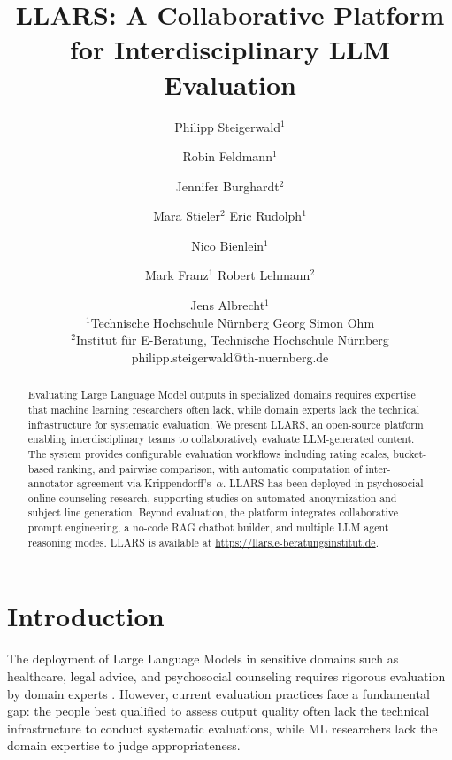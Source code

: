 \documentclass{article}
\title{LLARS: A Collaborative Platform for Interdisciplinary LLM Evaluation}
\author{
Philipp Steigerwald$^{1}$\and
Robin Feldmann$^{1}$\and
Jennifer Burghardt$^{2}$\and
Mara Stieler$^{2}$\And
Eric Rudolph$^{1}$\and
Nico Bienlein$^{1}$\and
Mark Franz$^{1}$\And
Robert Lehmann$^{2}$\and
Jens Albrecht$^{1}$\\
\affiliations
$^{1}$Technische Hochschule N\"urnberg Georg Simon Ohm\\
$^{2}$Institut f\"ur E-Beratung, Technische Hochschule N\"urnberg\\
\emails
philipp.steigerwald@th-nuernberg.de
}
\begin{document}
\maketitle


\begin{abstract}
Evaluating Large Language Model outputs in specialized domains requires expertise that machine learning researchers often lack, while domain experts lack the technical infrastructure for systematic evaluation.
We present LLARS, an open-source platform enabling interdisciplinary teams to collaboratively evaluate LLM-generated content.
The system provides configurable evaluation workflows including rating scales, bucket-based ranking, and pairwise comparison, with automatic computation of inter-annotator agreement via Krippendorff's~$\alpha$.
LLARS has been deployed in psychosocial online counseling research, supporting studies on automated anonymization and subject line generation.
Beyond evaluation, the platform integrates collaborative prompt engineering, a no-code RAG chatbot builder, and multiple LLM agent reasoning modes.
LLARS is available at \url{https://llars.e-beratungsinstitut.de}.
\end{abstract}

\section{Introduction}

The deployment of Large Language Models in sensitive domains such as healthcare, legal advice, and psychosocial counseling requires rigorous evaluation by domain experts \cite{chang2024survey}.
However, current evaluation practices face a fundamental gap: the people best qualified to assess output quality often lack the technical infrastructure to conduct systematic evaluations, while ML researchers lack the domain expertise to judge appropriateness.
\end{document}
